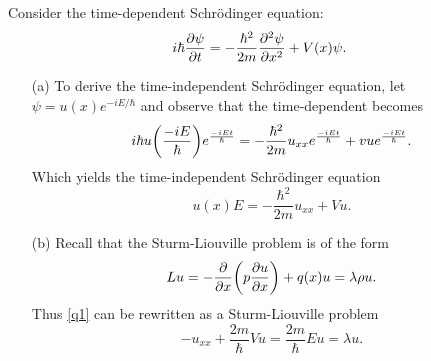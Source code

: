 \documentclass[12pt]{report}
\begin{document}
\begin{solution}

    \noindent
    Consider the time-dependent Schr\"odinger equation:
    \[
        i\hbar \frac{\partial \psi}{\partial t} = - \frac{\hbar^2}{2m}\frac{\partial^{2} \psi}{\partial x^{2}} + V(x)\psi.
    \]
    \begin{enumerate}
        \item [(a)]
        To derive the time-independent Schr\"odinger equation, let $\psi = u(x)e^{-iE/\hbar}$ and observe that the time-dependent becomes
        \begin{align*}
            i \hbar u {\left(\frac{-iE}{\hbar}\right)} e^{\frac{-iEt}{\hbar}} = - \frac{\hbar^2}{2m}u_{xx}e^{\frac{-iEt}{\hbar}} + vue^{\frac{-iEt}{\hbar}}.
        \end{align*}
         Which yields the time-independent Schr\"odinger equation
         \begin{equation} \label{q1}
            u(x)E = - \frac{\hbar^2}{2m}u_{xx} + Vu.
         \end{equation} 


        \item [(b)]
        Recall that the Sturm-Liouville problem is of the form
        \[ 
            Lu = -\frac{\partial }{\partial x}{\left(p \frac{\partial u}{\partial x}\right)} + q(x)u = \lambda \rho u.
        \]
        Thus \ref{q1} can be rewritten as a Sturm-Liouville problem
        \[ 
            -u_{xx} + \frac{2m}{\hbar}Vu = \frac{2m}{\hbar}Eu = \lambda u. 
        \]



\end{enumerate}
\end{solution}
\end{document}
